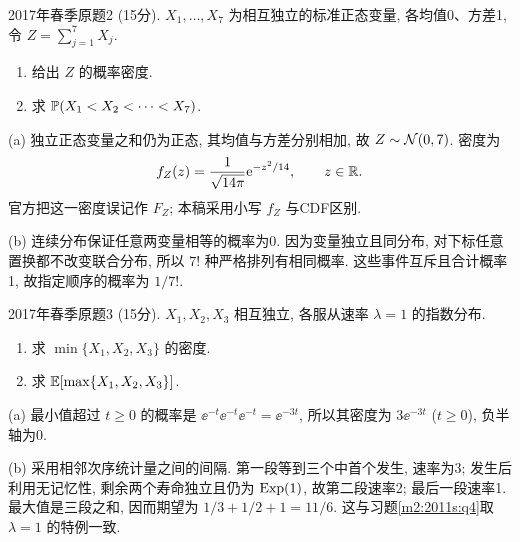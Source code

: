 \begin{exercise}\label{m2:2017s:q2}
2017年春季原题2 (15分). $X_1,\ldots,X_7$ 为相互独立的标准正态变量, 各均值0、方差1, 令 $Z=\sum_{j=1}^7X_j$.
\begin{enumerate}
\item[(a)]\label{m2:2017s:q2:a} 给出 $Z$ 的概率密度.
\item[(b)]\label{m2:2017s:q2:b} 求 $\mathbb P(X_1<X_2<\cdots<X_7)$.
\end{enumerate}
\end{exercise}
\begin{solution}
(a) 独立正态变量之和仍为正态, 其均值与方差分别相加, 故 $Z\sim\mathcal N(0,7)$. 密度为
\[
f_Z(z)=\frac1{\sqrt{14\pi}}\mathrm e^{-z^2/14},\qquad z\in\mathbb R.
\]
官方把这一密度误记作 $F_Z$; 本稿采用小写 $f_Z$ 与CDF区别.

(b) 连续分布保证任意两变量相等的概率为0. 因为变量独立且同分布, 对下标任意置换都不改变联合分布, 所以 $7!$ 种严格排列有相同概率. 这些事件互斥且合计概率1, 故指定顺序的概率为 $1/7!$.
\end{solution}

\begin{exercise}\label{m2:2017s:q3}
2017年春季原题3 (15分). $X_1,X_2,X_3$ 相互独立, 各服从速率 $\lambda=1$ 的指数分布.
\begin{enumerate}
\item[(a)]\label{m2:2017s:q3:a} 求 $\min\{X_1,X_2,X_3\}$ 的密度.
\item[(b)]\label{m2:2017s:q3:b} 求 $\mathbb E[\max\{X_1,X_2,X_3\}]$.
\end{enumerate}
\end{exercise}
\begin{solution}
(a) 最小值超过 $t\ge0$ 的概率是 $\ee^{-t}\ee^{-t}\ee^{-t}=\ee^{-3t}$, 所以其密度为 $3\ee^{-3t}$ ($t\ge0$), 负半轴为0.

(b) 采用相邻次序统计量之间的间隔. 第一段等到三个中首个发生, 速率为3; 发生后利用无记忆性, 剩余两个寿命独立且仍为 $\operatorname{Exp}(1)$, 故第二段速率2; 最后一段速率1. 最大值是三段之和, 因而期望为 $1/3+1/2+1=11/6$. 这与习题\ref{m2:2011s:q4}取 $\lambda=1$ 的特例一致.
\end{solution}

